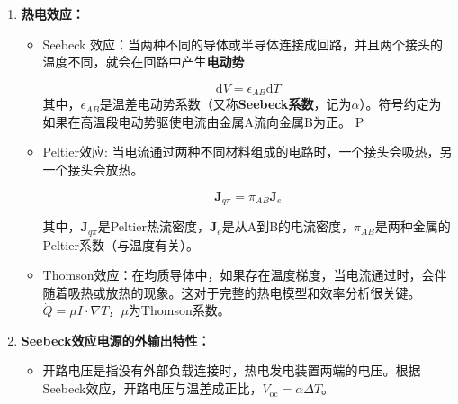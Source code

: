 \documentclass[dvipsnames, svgnames,a4paper,11pt]{article}
\begin{document}
        \begin{enumerate}
            \item \textbf{热电效应：}
            
                \begin{figure}[htbp]
                    \centering
                \end{figure}

                \begin{itemize}
                    \item Seebeck 效应：当两种不同的导体或半导体连接成回路，并且两个接头的温度不同，就会在回路中产生\textbf{电动势}
                    
                        \[
                            \mathrm{d}V=\epsilon_{AB}\mathrm{d}T
                        \]
                        其中，$\epsilon_{AB}$是温差电动势系数（又称\textbf{Seebeck系数}，记为$\alpha$）。符号约定为如果在高温段电动势驱使电流由金属A流向金属B为正。
        P
                    \item Peltier效应: 当电流通过两种不同材料组成的电路时，一个接头会吸热，另一个接头会放热。
                    
                        \[
                            \textbf{J}_{q\pi}=\pi_{AB}\textbf{J}_{e}
                        \]
        
                        其中，$\textbf{J}_{q\pi}$是Peltier热流密度，$\textbf{J}_{e}$是从A到B的电流密度，$\pi_{AB}$是两种金属的Peltier系数（与温度有关）。
        
                    \item Thomson效应：在均质导体中，如果存在温度梯度，当电流通过时，会伴随着吸热或放热的现象。这对于完整的热电模型和效率分析很关键。$\dot{Q}=\mu I\cdot \nabla T$，$\mu$为Thomson系数。
        



                \end{itemize}




            \item \textbf{Seebeck效应电源的外输出特性：}
            

                
                \begin{itemize}
                    \item 开路电压是指没有外部负载连接时，热电发电装置两端的电压。根据Seebeck效应，开路电压与温差成正比，$V_{\text{oc}} = \alpha \Delta T$。
                    

\end{itemize}
\end{enumerate}
\end{document}
